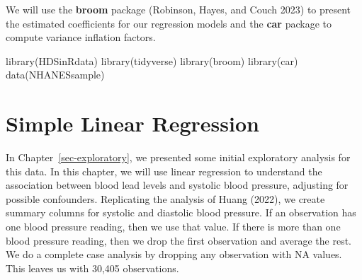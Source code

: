 \documentclass[
  letterpaper,
]{krantz}
\makeatletter
\newenvironment{Shaded}{\begin{snugshade}}{\end{snugshade}}
\newcommand{\FunctionTok}[1]{\textcolor[rgb]{0.28,0.35,0.67}{#1}}
\newcommand{\NormalTok}[1]{\textcolor[rgb]{0.00,0.23,0.31}{#1}}
\newenvironment{kframe}{%
\medskip{}
\setlength{\fboxsep}{.8em}
 \def\at@end@of@kframe{}%
 \ifinner\ifhmode%
  \def\at@end@of@kframe{\end{minipage}}%
  \begin{minipage}{\columnwidth}%
 \fi\fi%
 \def\FrameCommand##1{\hskip\@totalleftmargin \hskip-\fboxsep
 \colorbox{shadecolor}{##1}\hskip-\fboxsep
     \hskip-\linewidth \hskip-\@totalleftmargin \hskip\columnwidth}%
 \MakeFramed {\advance\hsize-\width
   \@totalleftmargin\z@ \linewidth\hsize
   \@setminipage}}%
 {\par\unskip\endMakeFramed%
 \at@end@of@kframe}
\renewenvironment{Shaded}{\begin{kframe}}{\end{kframe}}
\makeatother
\begin{document}
We will use the \textbf{broom} package (Robinson, Hayes, and Couch 2023)
to present the estimated coefficients for our regression models and the
\textbf{car} package to compute variance inflation factors.

\begin{Shaded}
\begin{Highlighting}[]
\FunctionTok{library}\NormalTok{(HDSinRdata)}
\FunctionTok{library}\NormalTok{(tidyverse)}
\FunctionTok{library}\NormalTok{(broom)}
\FunctionTok{library}\NormalTok{(car)}
\FunctionTok{data}\NormalTok{(NHANESsample)}
\end{Highlighting}
\end{Shaded}

\section{Simple Linear Regression}\label{simple-linear-regression}

In Chapter~\ref{sec-exploratory}, we presented some initial exploratory
analysis for this data. In this chapter, we will use linear regression
to understand the association between blood lead levels and systolic
blood pressure, adjusting for possible confounders. Replicating the
analysis of Huang (2022), we create summary columns for systolic and
diastolic blood pressure. If an observation has one blood pressure
reading, then we use that value. If there is more than one blood
pressure reading, then we drop the first observation and average the
rest. We do a complete case analysis by dropping any observation with NA
values. This leaves us with 30,405 observations.
\end{document}
